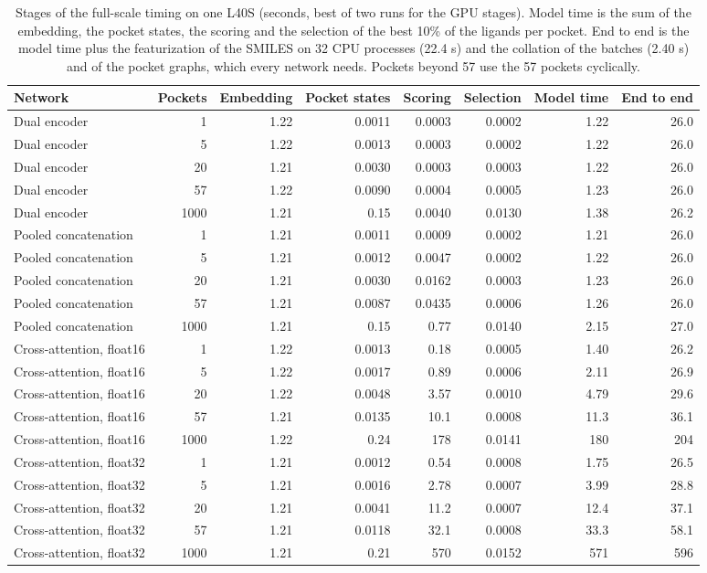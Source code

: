 \begin{table}[h]
\caption{Stages of the full-scale timing on one L40S (seconds, best of two runs for the GPU stages). Model time is the sum of the embedding, the pocket states, the scoring and the selection of the best 10\% of the ligands per pocket. End to end is the model time plus the featurization of the SMILES on 32 CPU processes (22.4 s) and the collation of the batches (2.40 s) and of the pocket graphs, which every network needs. Pockets beyond 57 use the 57 pockets cyclically.}
\label{tab:si_timing_b}
\footnotesize
\setlength{\tabcolsep}{3pt}
\begin{tabular}{lrrrrrrr}
\toprule
Network & Pockets & Embedding & Pocket states & Scoring & Selection & Model time & End to end \\
\midrule
Dual encoder & 1 & 1.22 & 0.0011 & 0.0003 & 0.0002 & 1.22 & 26.0 \\
Dual encoder & 5 & 1.22 & 0.0013 & 0.0003 & 0.0002 & 1.22 & 26.0 \\
Dual encoder & 20 & 1.21 & 0.0030 & 0.0003 & 0.0003 & 1.22 & 26.0 \\
Dual encoder & 57 & 1.22 & 0.0090 & 0.0004 & 0.0005 & 1.23 & 26.0 \\
Dual encoder & 1000 & 1.21 & 0.15 & 0.0040 & 0.0130 & 1.38 & 26.2 \\
\midrule
Pooled concatenation & 1 & 1.21 & 0.0011 & 0.0009 & 0.0002 & 1.21 & 26.0 \\
Pooled concatenation & 5 & 1.21 & 0.0012 & 0.0047 & 0.0002 & 1.22 & 26.0 \\
Pooled concatenation & 20 & 1.21 & 0.0030 & 0.0162 & 0.0003 & 1.23 & 26.0 \\
Pooled concatenation & 57 & 1.21 & 0.0087 & 0.0435 & 0.0006 & 1.26 & 26.0 \\
Pooled concatenation & 1000 & 1.21 & 0.15 & 0.77 & 0.0140 & 2.15 & 27.0 \\
\midrule
Cross-attention, float16 & 1 & 1.22 & 0.0013 & 0.18 & 0.0005 & 1.40 & 26.2 \\
Cross-attention, float16 & 5 & 1.22 & 0.0017 & 0.89 & 0.0006 & 2.11 & 26.9 \\
Cross-attention, float16 & 20 & 1.22 & 0.0048 & 3.57 & 0.0010 & 4.79 & 29.6 \\
Cross-attention, float16 & 57 & 1.21 & 0.0135 & 10.1 & 0.0008 & 11.3 & 36.1 \\
Cross-attention, float16 & 1000 & 1.22 & 0.24 & 178 & 0.0141 & 180 & 204 \\
\midrule
Cross-attention, float32 & 1 & 1.21 & 0.0012 & 0.54 & 0.0008 & 1.75 & 26.5 \\
Cross-attention, float32 & 5 & 1.21 & 0.0016 & 2.78 & 0.0007 & 3.99 & 28.8 \\
Cross-attention, float32 & 20 & 1.21 & 0.0041 & 11.2 & 0.0007 & 12.4 & 37.1 \\
Cross-attention, float32 & 57 & 1.21 & 0.0118 & 32.1 & 0.0008 & 33.3 & 58.1 \\
Cross-attention, float32 & 1000 & 1.21 & 0.21 & 570 & 0.0152 & 571 & 596 \\
\bottomrule
\end{tabular}
\end{table}
